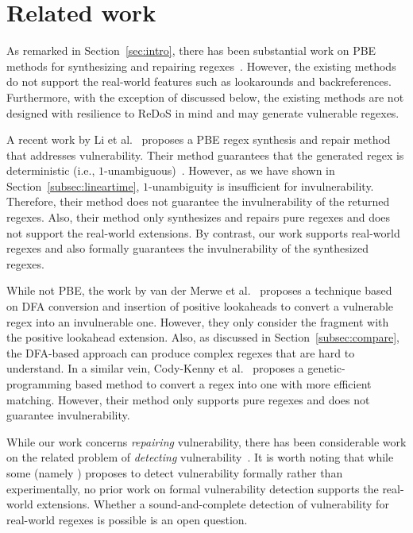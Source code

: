 \documentclass[conference]{IEEEtran}
\begin{document}
 
\section{Related work}
\label{sec:related}


As remarked in Section~\ref{sec:intro}, there has been substantial work on PBE methods for synthesizing and repairing regexes~\cite{Alquezar94incrementalgrammatical,10.1145/3093335.2993244, 6994453, 7374717, 10.1145/3360565, DBLP:journals/corr/abs-1908-03316, FlashRegex}.
However, the existing methods do not support the real-world features such as lookarounds and backreferences.  Furthermore, with the
exception of \cite{FlashRegex} discussed below, the existing methods are not designed with resilience to ReDoS in mind and may generate vulnerable 
regexes.

A recent work by Li et al.~\cite{FlashRegex} proposes a PBE regex synthesis and repair method that addresses vulnerability.  Their method guarantees that the generated regex is deterministic (i.e., $1$-unambiguous)~\cite{BRUGGEMANNKLEIN1998182,10.1007/3-540-57273-2_45}.  However, as we have shown in Section~\ref{subsec:lineartime}, $1$-unambiguity is insufficient for invulnerability. Therefore, their method does not guarantee the invulnerability of the returned regexes.  Also, their method only synthesizes and repairs pure regexes and does not support the real-world extensions.   By contrast, our work supports real-world regexes and also formally guarantees the invulnerability of the synthesized regexes.

While not PBE, the work by van der Merwe et al.~\cite{10.1145/3129416.3129440} proposes a technique based on DFA conversion and insertion of positive lookaheads to convert a vulnerable regex into an invulnerable one.  However, they only consider the fragment with the positive lookahead extension.  Also, as discussed in Section~\ref{subsec:compare}, the DFA-based approach can produce complex regexes that are hard to understand.  In a similar vein, Cody-Kenny et al.~\cite{10.1145/3071178.3071196} proposes a genetic-programming based method to convert a regex into one with more efficient matching.  However, their method only supports pure regexes and does not guarantee invulnerability.

While our work concerns {\em repairing} vulnerability, there has been considerable work on the related problem of {\em detecting} vulnerability~\cite{10.1007/978-3-662-54580-5_1, Shen:2018:RCR:3238147.3238159,10.1007/978-3-319-40946-7_27, 10.1007/978-3-642-38631-2_11, SatoshiSugiyama2014}.  It is worth noting that while some (namely \cite{10.1007/978-3-319-40946-7_27,SatoshiSugiyama2014,10.1007/978-3-662-54580-5_1}) proposes to detect vulnerability formally rather than experimentally, no prior work on formal vulnerability detection supports the real-world extensions.  Whether a sound-and-complete detection of vulnerability for real-world regexes is possible is an open question.
\end{document}

